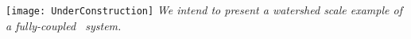 \label{chapter:IllustrativeExample}
\texttt{[image: UnderConstruction]} \textit{
We intend to present a watershed scale example of a fully-coupled \gwf\-\swf\ system.
}
